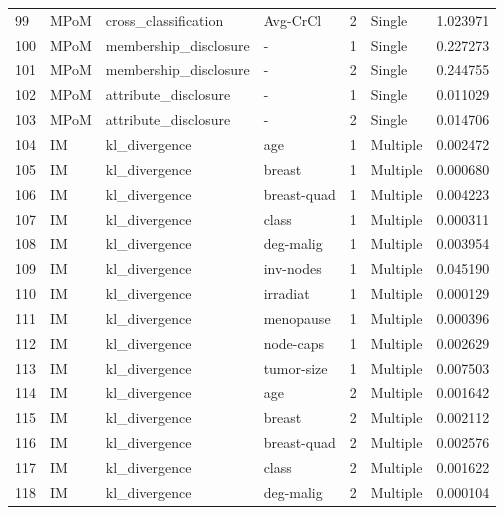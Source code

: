 \begin{tabular}{llllrlr}
99  &     MPoM &   cross\_classification &     Avg-CrCl &    2 &    Single &  1.023971 \\
100 &     MPoM &  membership\_disclosure &            - &    1 &    Single &  0.227273 \\
101 &     MPoM &  membership\_disclosure &            - &    2 &    Single &  0.244755 \\
102 &     MPoM &   attribute\_disclosure &            - &    1 &    Single &  0.011029 \\
103 &     MPoM &   attribute\_disclosure &            - &    2 &    Single &  0.014706 \\
104 &       IM &          kl\_divergence &          age &    1 &  Multiple &  0.002472 \\
105 &       IM &          kl\_divergence &       breast &    1 &  Multiple &  0.000680 \\
106 &       IM &          kl\_divergence &  breast-quad &    1 &  Multiple &  0.004223 \\
107 &       IM &          kl\_divergence &        class &    1 &  Multiple &  0.000311 \\
108 &       IM &          kl\_divergence &    deg-malig &    1 &  Multiple &  0.003954 \\
109 &       IM &          kl\_divergence &    inv-nodes &    1 &  Multiple &  0.045190 \\
110 &       IM &          kl\_divergence &     irradiat &    1 &  Multiple &  0.000129 \\
111 &       IM &          kl\_divergence &    menopause &    1 &  Multiple &  0.000396 \\
112 &       IM &          kl\_divergence &    node-caps &    1 &  Multiple &  0.002629 \\
113 &       IM &          kl\_divergence &   tumor-size &    1 &  Multiple &  0.007503 \\
114 &       IM &          kl\_divergence &          age &    2 &  Multiple &  0.001642 \\
115 &       IM &          kl\_divergence &       breast &    2 &  Multiple &  0.002112 \\
116 &       IM &          kl\_divergence &  breast-quad &    2 &  Multiple &  0.002576 \\
117 &       IM &          kl\_divergence &        class &    2 &  Multiple &  0.001622 \\
118 &       IM &          kl\_divergence &    deg-malig &    2 &  Multiple &  0.000104 \\

\end{tabular}
